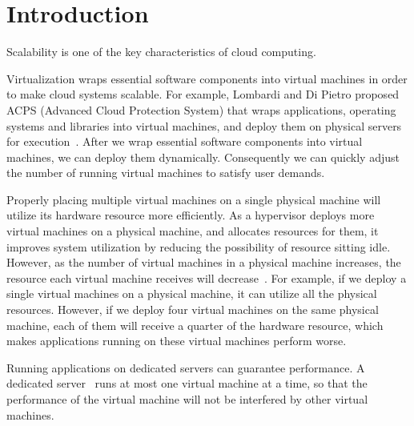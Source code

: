 \chapter{Introduction}


Scalability is one of the key characteristics of cloud computing.

Virtualization wraps essential software components into virtual machines
in order to make cloud systems scalable.
For example, Lombardi and Di Pietro proposed ACPS (Advanced Cloud
Protection System) that wraps applications, operating systems and
libraries into virtual machines, and deploy them on physical servers for
execution~\cite{cite:secure_virt_for_cloud, cite:cloud_issue}.
After we wrap essential software components into virtual machines, we
can deploy them dynamically.
Consequently we can quickly adjust the number of running virtual
machines to satisfy user demands.


Properly placing multiple virtual machines on a single physical machine
will utilize its hardware resource more efficiently.
As a hypervisor deploys more virtual machines on a physical machine, and
allocates resources for them, it improves system utilization by reducing
the possibility of resource sitting idle.
However, as the number of virtual machines in a physical machine
increases, the resource each virtual machine receives will
decrease~\cite{cite:resource_overbooking}.
For example, if we deploy a single virtual machines on a physical
machine, it can utilize all the physical resources.
However, if we deploy four virtual machines on the same physical
machine, each of them will receive a quarter of the hardware resource,
which makes applications running on these virtual machines perform
worse.

Running applications on dedicated servers can guarantee performance.
A dedicated server~\cite{cite:dedicated_hosting} runs at most one
virtual machine at a time, so that the performance of the virtual
machine will not be interfered by other virtual machines.

